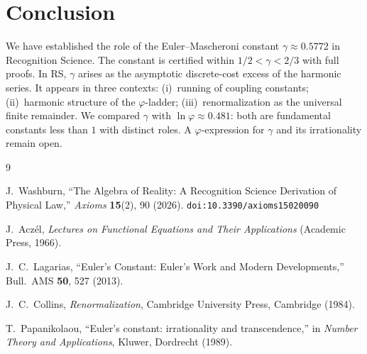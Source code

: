 \documentclass[12pt,a4paper]{article}
\theoremstyle{definition}
\theoremstyle{remark}
\begin{document}
\section{Conclusion}
\label{sec:conclusion}

We have established the role of the Euler--Mascheroni constant
$\gamma \approx 0.5772$ in Recognition Science.  The constant is
certified within $1/2 < \gamma < 2/3$ with full proofs.  In RS,
$\gamma$ arises as the asymptotic discrete-cost excess of the
harmonic series.  It appears in three contexts: (i)~running of
coupling constants; (ii)~harmonic structure of the
$\varphi$-ladder; (iii)~renormalization as the universal finite
remainder.  We compared $\gamma$ with $\ln\varphi \approx 0.481$:
both are fundamental constants less than $1$ with distinct roles.  A
$\varphi$-expression for $\gamma$ and its irrationality remain open.

\begin{thebibliography}{9}

J.~Washburn, ``The Algebra of Reality: A Recognition Science Derivation
of Physical Law,'' \emph{Axioms} \textbf{15}(2), 90 (2026).
\texttt{doi:10.3390/axioms15020090}

J.~Acz\'el, \emph{Lectures on Functional Equations and Their
Applications} (Academic Press, 1966).

J.~C.~Lagarias, ``Euler's Constant: Euler's Work and Modern
Developments,'' Bull.\ AMS \textbf{50}, 527 (2013).

J.~C.~Collins, \textit{Renormalization}, Cambridge University Press,
Cambridge (1984).

T.~Papanikolaou, ``Euler's constant: irrationality and
transcendence,'' in \textit{Number Theory and Applications},
Kluwer, Dordrecht (1989).
\end{thebibliography}
\end{document}

